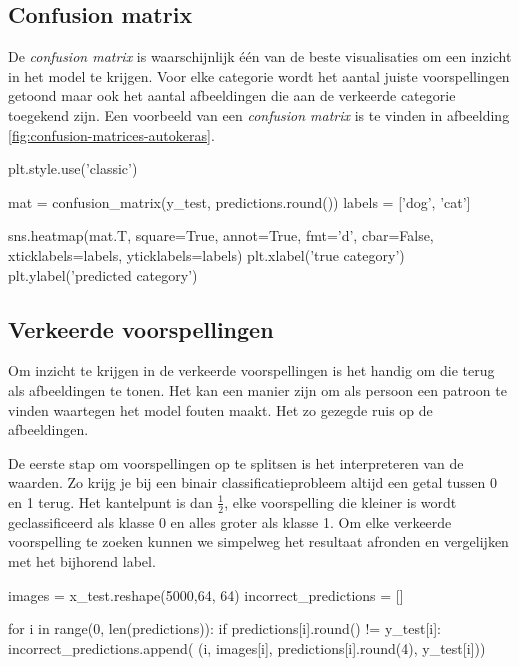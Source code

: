 \subsection{Confusion matrix}
\label{subsec:confusion-autokeras}

De \textit{confusion matrix} is waarschijnlijk één van de beste visualisaties om een inzicht in het model te krijgen. Voor elke categorie wordt het aantal juiste voorspellingen getoond maar ook het aantal afbeeldingen die aan de verkeerde categorie toegekend zijn. Een voorbeeld van een \textit{confusion matrix} is te vinden in afbeelding \ref{fig:confusion-matrices-autokeras}.

\bigskip

\begin{python}
plt.style.use('classic')

mat = confusion_matrix(y_test, predictions.round())
labels = ['dog', 'cat']

sns.heatmap(mat.T, square=True, annot=True, fmt='d', cbar=False, xticklabels=labels, yticklabels=labels)
plt.xlabel('true category')
plt.ylabel('predicted category')
\end{python} 


\subsection{Verkeerde voorspellingen}
\label{subsec:wrong-predictions}

Om inzicht te krijgen in de verkeerde voorspellingen is het handig om die terug als afbeeldingen te tonen. Het kan een manier zijn om als persoon een patroon te vinden waartegen het model fouten maakt. Het zo gezegde ruis op de afbeeldingen. 

De eerste stap om voorspellingen op te splitsen is het interpreteren van de waarden. Zo krijg je bij een binair classificatieprobleem altijd een getal tussen 0 en 1 terug. Het kantelpunt is dan $\frac{1}{2}$, elke voorspelling die kleiner is wordt geclassificeerd als klasse 0 en alles groter als klasse 1. Om elke verkeerde voorspelling te zoeken kunnen we simpelweg het resultaat afronden en vergelijken met het bijhorend label.

\bigskip

\begin{python}
images = x_test.reshape(5000,64, 64)
incorrect_predictions = []

for i in range(0, len(predictions)):
    if predictions[i].round() != y_test[i]:
        incorrect_predictions.append(
            (i, images[i], predictions[i].round(4), y_test[i]))
\end{python}

